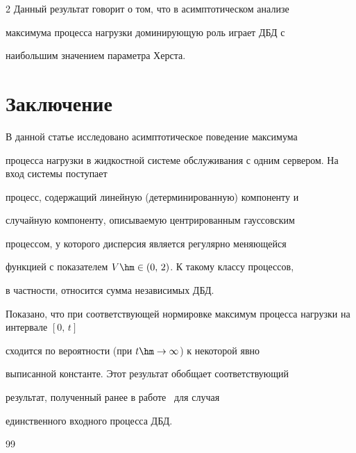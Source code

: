 \begin{multicols}{2}
Данный результат говорит о том, что в асимптотическом анализе


максимума процесса нагрузки доминирующую роль играет ДБД с


наибольшим значением параметра Херста.











\section{Заключение}





В данной статье исследовано асимптотическое поведение максимума


 процесса нагрузки в  жидкостной  системе обслуживания с одним сервером. На вход системы  поступает


процесс, содержащий   линейную (детерминированную) компоненту и


случайную компоненту, описываемую центрированным гауссовским


процессом, у которого дисперсия является регулярно меняющейся


функцией  с показателем  $V\hm\in (0,\,2)$. К такому классу процессов,


в частности, относится сумма независимых  ДБД.


 Показано, что при соответствующей  нормировке максимум процесса нагрузки на интервале $[0,\,t]$


сходится по вероятности (при  $t\hm\to \infty$) к некоторой явно


выписанной  константе. Этот результат обобщает соответствующий


результат, полученный ранее в работе~\cite{Zeevi} для случая


единственного входного процесса ДБД.





{\small\frenchspacing


{%




\begin{thebibliography}{99}








\end{thebibliography}}}
\end{multicols}
